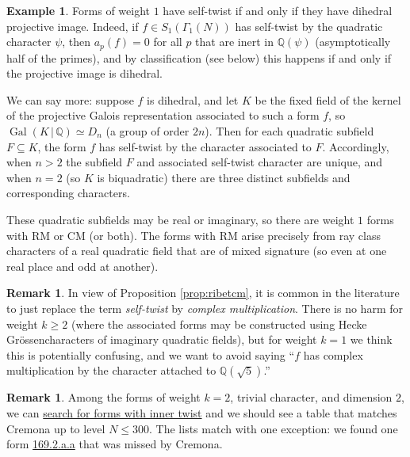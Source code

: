 \documentclass[11pt]{amsart}
\numberwithin{equation}{subsection}
\theoremstyle{plain}
\theoremstyle{definition}
\newtheorem{rmk}[equation]{Remark}
\newtheorem{exm}[equation]{Example}
\newcommand{\Q}{\mathbb{Q}}
\DeclareMathOperator{\Gal}{Gal}
\begin{document}
\begin{exm}
Forms of weight $1$ have self-twist if and only if they have dihedral projective image.  Indeed, if $f \in S_1(\Gamma_1(N))$ has self-twist by the quadratic character $\psi$, then $a_p(f)=0$ for all $p$ that are inert in $\Q(\psi)$ (asymptotically half of the primes), and by classification (see below) this happens if and only if the projective image is dihedral.  

We can say more: suppose $f$ is dihedral, and let $K$ be the fixed field of the kernel of the projective Galois representation associated to such a form $f$, so $\Gal(K\,|\,\Q) \simeq D_n$ (a group of order $2n$).  Then for each quadratic subfield $F \subseteq K$, the form $f$ has self-twist by the character associated to $F$.  Accordingly, when $n>2$ the subfield $F$ and associated self-twist character are unique, and when $n=2$ (so $K$ is biquadratic) there are three distinct subfields and corresponding characters.  

These quadratic subfields may be real or imaginary, so there are weight $1$ forms with RM or CM (or both).  The forms with RM arise precisely from ray class characters of a real quadratic field that are of mixed signature (so even at one real place and odd at another).  
\end{exm}

\begin{rmk}
In view of Proposition \ref{prop:ribetcm}, it is common in the literature to just replace the term \emph{self-twist} by \emph{complex multiplication}.  There is no harm for weight $k \geq 2$ (where the associated forms may be constructed using Hecke Gr\"ossencharacters of imaginary quadratic fields), but for weight $k=1$ we think this is potentially confusing, and we want to avoid saying ``$f$ has complex multiplication by the character attached to $\Q(\sqrt{5})$.''
\end{rmk}

\begin{rmk}
Among the forms of weight $k=2$, trivial character, and dimension $2$, we can \href{http://cmfs.lmfdb.xyz/ModularForm/GL2/Q/holomorphic/?weight=2&char_order=1&dim=2&has_inner_twist=yes&count=50&search_type=List}{search for forms with inner twist} and we should see a table that matches Cremona \cite[Table 3]{Cremona:abextratwist} up to level $N \leq 300$.  The lists match with one exception: we found one form \href{http://cmfs.lmfdb.xyz/ModularForm/GL2/Q/holomorphic/169/2/a/a/}{\textsf{169.2.a.a}} that was missed by Cremona.
\end{rmk}
\end{document}
